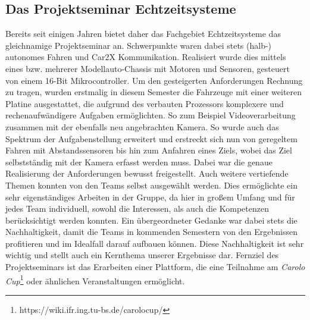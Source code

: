 \subsection{Das Projektseminar Echtzeitsysteme}
Bereits seit einigen Jahren bietet daher das Fachgebiet Echtzeitsysteme das gleichnamige Projektseminar an. Schwerpunkte waren dabei stets (halb-) autonomes Fahren und Car2X Kommunikation. Realisiert wurde dies mittels eines bzw. mehrerer Modellauto-Chassis mit Motoren und Sensoren, gesteuert von einem 16-Bit Mikrocontroller. Um den gesteigerten Anforderungen Rechnung zu tragen, wurden erstmalig in diesem Semester die Fahrzeuge mit einer weiteren Platine ausgestattet, die aufgrund des verbauten Prozessors komplexere und rechenaufwändigere Aufgaben ermöglichten. So zum Beispiel Videoverarbeitung zusammen mit der ebenfalls neu angebrachten Kamera. So wurde auch das Spektrum der Aufgabenstellung erweitert und erstreckt sich nun von geregeltem Fahren mit Abstandssensoren bis hin zum Anfahren eines Ziels, wobei das Ziel selbstständig mit der Kamera erfasst werden muss. Dabei war die genaue Realisierung der Anforderungen bewusst freigestellt. Auch weitere vertiefende Themen konnten von den Teams selbst ausgewählt werden. Dies ermöglichte ein sehr eigenständiges Arbeiten in der Gruppe, da hier in großem Umfang und für jedes Team individuell, sowohl die Interessen, als auch die Kompetenzen berücksichtigt werden konnten.
\pagebreak \newline
Ein übergeordneter Gedanke war dabei stets die Nachhaltigkeit, damit die Teams in kommenden Semestern von den Ergebnissen profitieren und im Idealfall darauf aufbauen können. Diese Nachhaltigkeit ist sehr wichtig und stellt auch ein Kernthema unserer Ergebnisse dar. Fernziel des Projektseminars ist das Erarbeiten einer Plattform, die eine Teilnahme am \textit{Carolo Cup}\footnote[1]{https://wiki.ifr.ing.tu-bs.de/carolocup/} oder ähnlichen Veranstaltungen ermöglicht.
